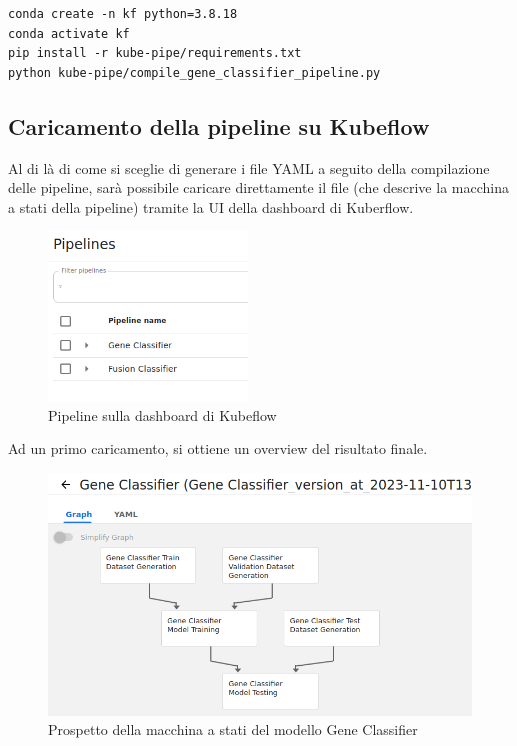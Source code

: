 \begin{small}
\begin{Verbatim}[commandchars=\\\{\}]
conda create -n kf python=3.8.18
conda activate kf
pip install -r kube-pipe/requirements.txt
python kube-pipe/compile_gene_classifier_pipeline.py
\end{Verbatim}
\end{small}

\subsection{Caricamento della pipeline su Kubeflow}

Al di là di come si sceglie di generare i file YAML a seguito della compilazione delle pipeline, sarà possibile caricare direttamente il file (che descrive la macchina a stati della pipeline) tramite la UI della dashboard di Kuberflow.

\begin{figure}[H]
    \centering
    \includegraphics[width=200px]{figures/ch4and5/pp.png}
    \caption[Pipeline sulla dashboard di Kubeflow]{Pipeline sulla dashboard di Kubeflow}
    \label{fig:cha6:pp-ui}
\end{figure}

Ad un primo caricamento, si ottiene un overview del risultato finale.

\begin{figure}[H]
    \centering
    \includegraphics[width=\linewidth]{figures/ch4and5/stale.png}
    \caption[Prospetto della macchina a stati del modello Gene Classifier]{Prospetto della macchina a stati del modello Gene Classifier}
    \label{fig:cha6:stale}
\end{figure}

